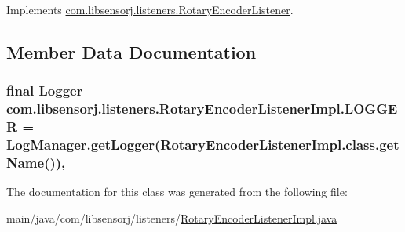 Implements \hyperlink{interfacecom_1_1libsensorj_1_1listeners_1_1RotaryEncoderListener_aa04a814b5886e2fd2c095a8c2827b6a8}{com.\+libsensorj.\+listeners.\+Rotary\+Encoder\+Listener}.



\subsection{Member Data Documentation}
\hypertarget{classcom_1_1libsensorj_1_1listeners_1_1RotaryEncoderListenerImpl_af88de2de8fdc7d0d31d454648560aa41}{}
\subsubsection[{L\+O\+G\+G\+E\+R}]{\setlength{\rightskip}{0pt plus 5cm}final Logger com.\+libsensorj.\+listeners.\+Rotary\+Encoder\+Listener\+Impl.\+L\+O\+G\+G\+E\+R = Log\+Manager.\+get\+Logger(Rotary\+Encoder\+Listener\+Impl.\+class.\+get\+Name())\hspace{0.3cm}{\ttfamily [static]}, {\ttfamily [private]}}\label{classcom_1_1libsensorj_1_1listeners_1_1RotaryEncoderListenerImpl_af88de2de8fdc7d0d31d454648560aa41}


The documentation for this class was generated from the following file\+:\begin{DoxyCompactItemize}
\item 
main/java/com/libsensorj/listeners/\hyperlink{RotaryEncoderListenerImpl_8java}{Rotary\+Encoder\+Listener\+Impl.\+java}\end{DoxyCompactItemize}
